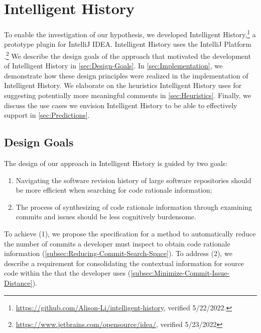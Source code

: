 \chapter{Intelligent History}
\label{ch:Intelligent-History}

To enable the investigation of our hypothesis, we developed Intelligent History,\footnote{\url{https://github.com/Alison-Li/intelligent-history}, verified 5/22/2022.} a prototype plugin for IntelliJ IDEA.
Intelligent History uses the IntelliJ Platform .\footnote{\url{https://www.jetbrains.com/opensource/idea/}, verified 5/23/2022}
We describe the design goals of the approach that motivated the development of Intelligent History in \autoref{sec:Design-Goals}. 
In \autoref{sec:Implementation}, we demonstrate how these design principles were realized in the implementation of Intelligent History. 
We elaborate on the heuristics Intelligent History uses
for suggesting potentially more meaningful comments in \autoref{sec:Heuristics}.
Finally, we discuss the use cases we envision Intelligent History to be able to effectively support in \autoref{sec:Predictions}.

\section{Design Goals}
\label{sec:Design-Goals}

The design of our approach in Intelligent History is guided by two goals: 

\begin{enumerate}[label={(\arabic*)}]
    \item Navigating the software revision history of large software repositories should be more efficient when searching for code rationale information;
    \item The process of synthesizing of code rationale information through examining commits and issues should be less cognitively burdensome.
\end{enumerate}

To achieve (1), we propose the specification for a method to automatically reduce the number of commits a developer must inspect to obtain code rationale information (\autoref{subsec:Reducing-Commit-Search-Space}).
To address (2), we describe a requirement for consolidating the contextual information for source code within the  that the developer uses (\autoref{subsec:Minimize-Commit-Issue-Distance}).

